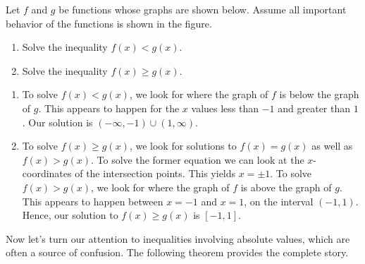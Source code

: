 \documentclass[noauthor, nooutcomes]{ximera}
\begin{document}
\begin{example}
Let $f$ and $g$ be functions whose graphs are shown below. Assume all important behavior of the functions is shown in the figure.

\begin{image}
\end{image}
 
\begin{enumerate}
	\item Solve the inequality $f(x) < g(x)$.
	\item Solve the inequality $f(x) \ge g(x)$.
\end{enumerate}
\end{example}


\begin{explanation}
\begin{enumerate}
	\item  To solve $f(x) < g(x)$, we look for where the graph of $f$ is below the graph of $g$. This appears to happen for the $x$ values less than $-1$ and greater than $1$. Our solution is $(-\infty, -1) \cup (1,\infty)$.

	\item To solve $f(x) \geq g(x)$, we look for solutions to $f(x)=g(x)$ as well as $f(x) > g(x)$. To solve the former equation we can look at the $x$-coordinates of the intersection points. This yields $x = \pm 1$. To solve $f(x) > g(x)$, we look for where the graph of $f$ is above the graph of $g$.  This appears to happen between $x=-1$ and $x=1$, on the interval $(-1,1)$. Hence, our solution to $f(x) \geq g(x)$ is $[-1,1]$. 
\end{enumerate}
\end{explanation}

Now let's turn our attention to inequalities involving absolute values, which are often a source of confusion. The following theorem provides the complete story.
\end{document}
